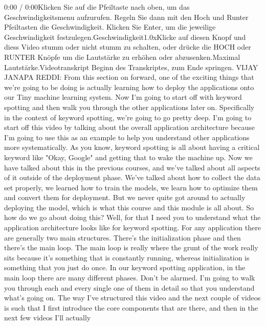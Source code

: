      0:00 / 0:00Klicken Sie auf die Pfeiltaste nach oben, um das Geschwindigkeitsmenu aufzurufen. Regeln Sie dann mit den Hoch und Runter Pfeiltasten die Geschwindigkeit. Klicken Sie Enter, um die jeweilige Geschwindigkeit festzulegen.Geschwindigkeit1.0xKlicke auf diesen Knopf und diess Video stumm oder nicht stumm zu schalten, oder drücke die HOCH oder RUNTER Knöpfe um die Lautstärke zu erhöhen oder abzusenken.Maximal Lautstärke.Videotranskript
     Beginn des Transkriptes, zum Ende springen.
     VIJAY JANAPA REDDI: From this section on forward,
     one of the exciting things that we're going to be doing
     is actually learning how to deploy the applications onto our Tiny machine
     learning system.
     Now I'm going to start off with keyword spotting
     and then walk you through the other applications later on.
     Specifically in the context of keyword spotting,
     we're going to go pretty deep.
     I'm going to start off this video by talking about the overall application
     architecture because I'm going to use this
     as an example to help you understand other applications more systematically.
     As you know, keyword spotting is all about having
     a critical keyword like "Okay, Google" and getting that
     to wake the machine up.
     Now we have talked about this in the previous courses,
     and we've talked about all aspects of it outside of the deployment phase.
     We've talked about how to collect the data set properly,
     we learned how to train the models, we learn
     how to optimize them and convert them for deployment.
     But we never quite got around to actually deploying
     the model, which is what this course and this module is all about.
     So how do we go about doing this?
     Well, for that I need you to understand what the application architecture looks
     like for keyword spotting.
     For any application there are generally two main structures.
     There's the initialization phase and then there's the main loop.
     The main loop is really where the grunt of the work
     really sits because it's something that is constantly
     running, whereas initialization is something that you just do once.
     In our keyword spotting application, in the main loop
     there are many different phases.
     Don't be alarmed.
     I'm going to walk you through each and every single one of them in detail
     so that you understand what's going on.
     The way I've structured this video and the next couple of videos
     is such that I first introduce the core components that are there,
     and then in the next few videos I'll actually
